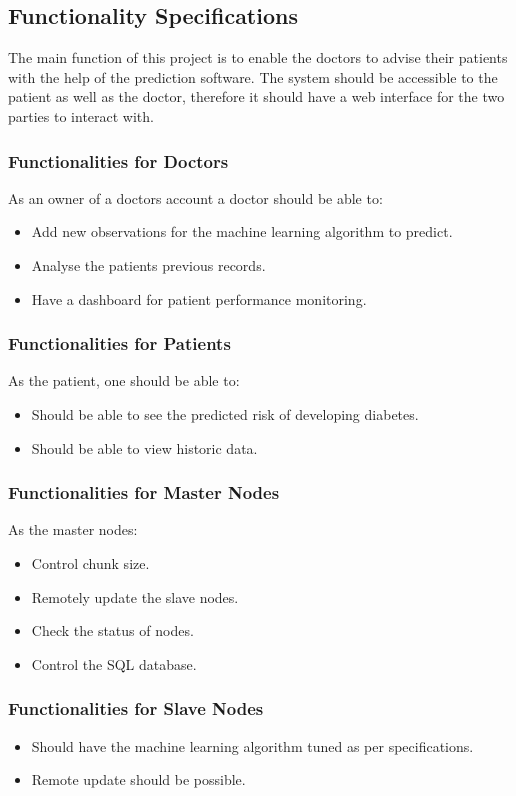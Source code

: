 \documentclass[12pt]{article}
\begin{document}
\newpage
\subsection{Functionality Specifications}
The main function of this project is to enable the doctors to advise their patients with the help of the prediction software. The system should be accessible to the patient as well as the doctor, therefore it should have a web interface for the two parties to interact with.

\subsubsection{Functionalities for Doctors}
As an owner of a doctors account a doctor should be able to:
\begin{itemize}
\item Add new observations for the machine learning algorithm to predict.
\item Analyse the patients previous records.
\item Have a dashboard for patient performance monitoring.
\end{itemize}

\subsubsection{Functionalities for Patients}
As the patient, one should be able to:
\begin{itemize}
\item Should be able to see the predicted risk of developing diabetes.
\item Should be able to view historic data.
\end{itemize}

\subsubsection{Functionalities for Master Nodes}
As the master nodes:
\begin{itemize}
\item Control chunk size.
\item Remotely update the slave nodes.
\item Check the status of nodes.
\item Control the SQL database.
\end{itemize}

\subsubsection{Functionalities for Slave Nodes}
\begin{itemize}
\item Should have the machine learning algorithm tuned as per specifications.
\item Remote update should be possible.
\end{itemize}
\end{document}
